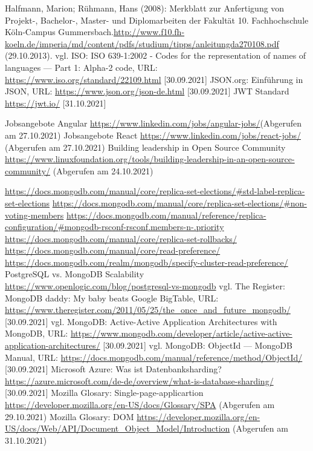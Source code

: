 \begin{thebibliography}{HR08}
 Halfmann, Marion; Rühmann, Hans (2008): Merkblatt zur Anfertigung von Projekt-, Bachelor-, Master- und Diplomarbeiten der Fakultät 10. Fachhochschule Köln-Campus Gummersbach.\url{http://www.f10.fh-koeln.de/imperia/md/content/pdfs/studium/tipps/anleitungda270108.pdf} (29.10.2013).
 vgl. ISO: ISO 639-1:2002 - Codes for the representation of names of languages — Part 1: Alpha-2 code, URL: \url{https://www.iso.org/standard/22109.html} [30.09.2021]
 JSON.org: Einführung in JSON, URL: \url{https://www.json.org/json-de.html} [30.09.2021]
 JWT Standard \url{https://jwt.io/} [31.10.2021]

 Jobsangebote Angular \url{https://www.linkedin.com/jobs/angular-jobs/}(Abgerufen am 27.10.2021)
 Jobsangebote React \url{https://www.linkedin.com/jobs/react-jobs/}  (Abgerufen am 27.10.2021)
Building leadership in Open Source Community \url{https://www.linuxfoundation.org/tools/building-leadership-in-an-open-source-community/} (Abgerufen am 24.10.2021)

 \url{https://docs.mongodb.com/manual/core/replica-set-elections/#std-label-replica-set-elections}
 \url{https://docs.mongodb.com/manual/core/replica-set-elections/#non-voting-members}
 \url{https://docs.mongodb.com/manual/reference/replica-configuration/#mongodb-rsconf-rsconf.members-n-.priority}
 \url{https://docs.mongodb.com/manual/core/replica-set-rollbacks/}
 \url{https://docs.mongodb.com/manual/core/read-preference/}
 \url{https://docs.mongodb.com/realm/mongodb/specify-cluster-read-preference/}
 PostgreSQL vs. MongoDB Scalability \url{https://www.openlogic.com/blog/postgresql-vs-mongodb}
 vgl. The Register: MongoDB daddy: My baby beats Google BigTable, URL: \url{https://www.theregister.com/2011/05/25/the_once_and_future_mongodb/} [30.09.2021]
 vgl. MongoDB: Active-Active Application Architectures with MongoDB, URL: \url{https://www.mongodb.com/developer/article/active-active-application-architectures/} [30.09.2021]
 vgl. MongoDB: ObjectId — MongoDB Manual, URL: \url{https://docs.mongodb.com/manual/reference/method/ObjectId/} [30.09.2021]
 Microsoft Azure: Was ist Datenbanksharding? \url{https://azure.microsoft.com/de-de/overview/what-is-database-sharding/} [30.09.2021]
 Mozilla Glosary: Single-page-applicartion \url{https://developer.mozilla.org/en-US/docs/Glossary/SPA} (Abgerufen am 29.10.2021)
 Mozilla Glosary: DOM \url{https://developer.mozilla.org/en-US/docs/Web/API/Document_Object_Model/Introduction} (Abgerufen am 31.10.2021)


\end{thebibliography}
